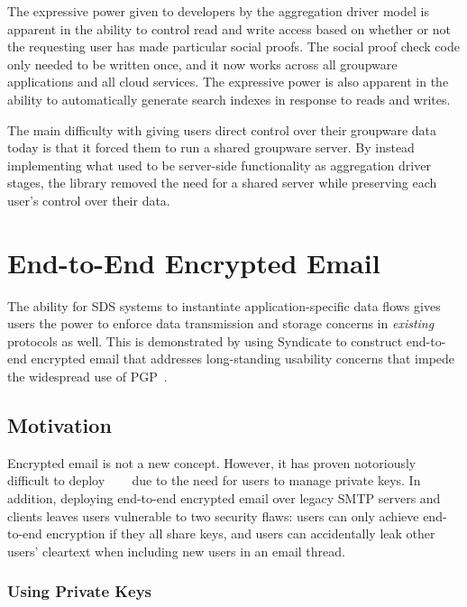 The expressive power given to developers by the aggregation driver model is
apparent in the ability to control read and write access based on whether or not
the requesting user has made particular social proofs. The social proof check
code only needed to be written once, and it now works across all groupware
applications and all cloud services.  The expressive power is also apparent in
the ability to automatically generate search indexes in response to reads and
writes.

The main difficulty with giving users direct control over their groupware data
today is that it forced them to run a shared groupware server.  By instead
implementing what used to be server-side functionality as aggregation driver
stages, the library removed the need for a shared server while preserving each
user's control over their data.

\section{End-to-End Encrypted Email}

The ability for SDS systems to instantiate application-specific data flows gives
users the power to enforce data transmission and storage concerns in
\emph{existing} protocols as well.  This is demonstrated by using Syndicate to construct
end-to-end encrypted email that addresses long-standing
usability concerns that impede the widespread use of PGP~\cite{pgp}.

\subsection{Motivation}

Encrypted email is not a new concept.  However, it has proven notoriously difficult to
deploy~\cite{why-jonny-cant-encrypt}~\cite{why-jonny-still-cant-encrypt}
~\cite{why-jonny-still-still-cant-encrypt} due to the need for users to manage
private keys.  In addition, deploying end-to-end encrypted email over legacy
SMTP servers and clients leaves users vulnerable to two security flaws:  users
can only achieve end-to-end encryption if they all share keys, and users can
accidentally leak other users' cleartext when including new users in an email
thread.

\subsubsection{Using Private Keys}

